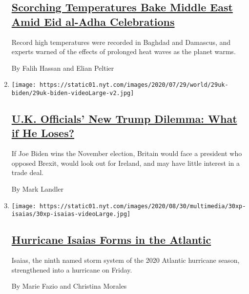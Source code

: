 \begin{enumerate}
{  \subsection{\texorpdfstring{\href{/2020/07/31/world/middleeast/Middle-East-heat-wave.html}{Scorching
  Temperatures Bake Middle East Amid Eid al-Adha
  Celebrations}}{Scorching Temperatures Bake Middle East Amid Eid al-Adha Celebrations}}\label{scorching-temperatures-bake-middle-east-amid-eid-al-adha-celebrations}}

  Record high temperatures were recorded in Baghdad and Damascus, and
  experts warned of the effects of prolonged heat waves as the planet
  warms.

  By Falih Hassan and Elian Peltier
\item
  \texttt{[image: https://static01.nyt.com/images/2020/07/29/world/29uk-biden/29uk-biden-videoLarge-v2.jpg]}

  \hypertarget{uk-officials-new-trump-dilemma-what-if-he-loses}{%
  \subsection{\texorpdfstring{\href{/2020/07/31/world/europe/britain-biden-presidency-johnson.html}{U.K.
  Officials' New Trump Dilemma: What if He
  Loses?}}{U.K. Officials' New Trump Dilemma: What if He Loses?}}\label{uk-officials-new-trump-dilemma-what-if-he-loses}}

  If Joe Biden wins the November election, Britain would face a
  president who opposed Brexit, would look out for Ireland, and may have
  little interest in a trade deal.

  By Mark Landler
\item
  \texttt{[image: https://static01.nyt.com/images/2020/08/30/multimedia/30xp-isaias/30xp-isaias-videoLarge.jpg]}

  \hypertarget{hurricane-isaias-forms-in-the-atlantic}{%
  \subsection{\texorpdfstring{\href{/2020/07/30/us/tropical-storm-isaias.html}{Hurricane
  Isaias Forms in the
  Atlantic}}{Hurricane Isaias Forms in the Atlantic}}\label{hurricane-isaias-forms-in-the-atlantic}}

  Isaias, the ninth named storm system of the 2020 Atlantic hurricane
  season, strengthened into a hurricane on Friday.

  By Marie Fazio and Christina Morales
\end{enumerate}

